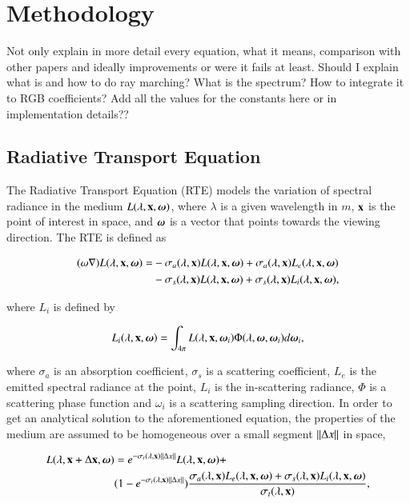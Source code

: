 \chapter{Methodology}
\label{ch:methodology}

Not only explain in more detail every equation, what it means, comparison with other papers and ideally improvements or were it fails at least.
Should I explain what is and how to do ray marching? What is the spectrum? How to integrate it to RGB coefficients?
Add all the values for the constants here or in implementation details??

\section{Radiative Transport Equation}
\label{sec:radiative_transport_equation}

The Radiative Transport Equation (RTE) models the variation of spectral radiance in the medium $L(\lambda, \mathbf{x}, \boldsymbol{\omega})$, where $\lambda$ is a given wavelength in $m$, $\mathbf{x}$ is the point of interest in space, and $\boldsymbol{\omega}$ is a vector that points towards the viewing direction.
The RTE is defined as

\begin{equation}
\begin{split}
(\omega \nabla) L(\lambda, \mathbf{x}, \boldsymbol{\omega}) = &- \sigma_a(\lambda, \mathbf{x}) L(\lambda, \mathbf{x}, \boldsymbol{\omega}) + \sigma_a(\lambda, \mathbf{x}) L_e(\lambda, \mathbf{x}, \boldsymbol{\omega}) \\
&- \sigma_s(\lambda, \mathbf{x}) L(\lambda, \mathbf{x}, \boldsymbol{\omega}) + \sigma_s(\lambda, \mathbf{x}) L_i(\lambda, \mathbf{x}, \boldsymbol{\omega}),
\end{split}
\end{equation}

where $L_i$ is defined by

\begin{equation}
L_i(\lambda, \mathbf{x}, \boldsymbol{\omega}) = \int_{4 \pi} L(\lambda, \mathbf{x}, \boldsymbol{\omega}_i) \Phi (\lambda, \boldsymbol{\omega}, \boldsymbol{\omega}_i) d \boldsymbol{\omega}_i,
\end{equation}

where $\sigma_a$ is an absorption coefficient, $\sigma_s$ is a scattering coefficient, $L_e$ is the emitted spectral radiance at the point, $L_i$ is the in-scattering radiance, $\Phi$ is a scattering phase function and $\omega_i$ is a scattering sampling direction.
In order to get an analytical solution to the aforementioned equation, the properties of the medium are assumed to be homogeneous over a small segment $\left \| \Delta x \right \|$ in space,

\begin{equation}
\label{eq:rte_solution_paper}
\begin{split}
L(\lambda, \mathbf{x} + \Delta\mathbf{x}, \boldsymbol{\omega}) &= e^{-\sigma_t(\lambda, \mathbf{x}) \left \| \Delta x \right \|} L(\lambda, \mathbf{x}, \boldsymbol{\omega}) +  \\
& (1 - e^{-\sigma_t(\lambda, \mathbf{x}) \left \| \Delta x \right \|} ) \frac{\sigma_a(\lambda, \mathbf{x}) L_e(\lambda, \mathbf{x}, \boldsymbol{\omega}) + \sigma_s(\lambda, \mathbf{x}) L_i(\lambda, \mathbf{x}, \boldsymbol{\omega})}{\sigma_t(\lambda, \mathbf{x})},
\end{split}
\end{equation}

